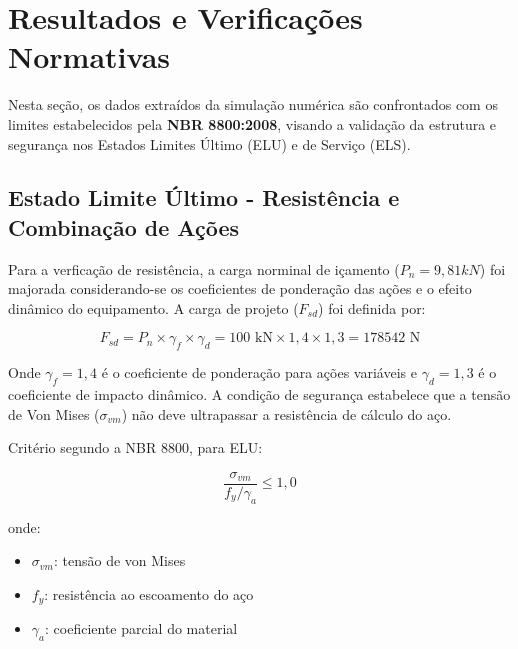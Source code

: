 \documentclass[12pt, a4paper]{article}
\begin{document}
\section{Resultados e Verificações Normativas}

Nesta seção, os dados extraídos da simulação numérica são confrontados com os limites estabelecidos pela \textbf{NBR 8800:2008}, visando a validação da estrutura e segurança nos Estados Limites Último (ELU) e de Serviço (ELS).

\subsection{Estado Limite Último - Resistência e Combinação de Ações}

Para a verficação de resistência, a carga norminal de içamento ($P_n=9,81kN$) foi majorada considerando-se os coeficientes de ponderação das ações e o efeito dinâmico do equipamento. A carga de projeto ($F_{sd}$) foi definida por:

\begin{equation}
    F_{sd} = P_n \times \gamma_f \times \gamma_d = 100\text{ kN} \times 1,4 \times 1,3 = 178542\text{ N}
\end{equation}

Onde $\gamma_f = 1,4$ é o coeficiente de ponderação para ações variáveis e $\gamma_d = 1,3$ é o coeficiente de impacto dinâmico. A condição de segurança estabelece que a tensão de Von Mises ($\sigma_{vm}$) não deve ultrapassar a resistência de cálculo do aço.

Critério segundo a NBR 8800, para ELU:

\begin{equation}
    \frac{\sigma_{vm}}{f_{y}/\gamma_{a}} \le 1,0
\end{equation}

onde:

\begin{itemize}
    \item $\sigma_{vm}$: tensão de von Mises
    \item  $f_{y}$: resistência ao escoamento do aço
    \item $\gamma_{a}$: coeficiente parcial do material
\end{itemize}
\end{document}
